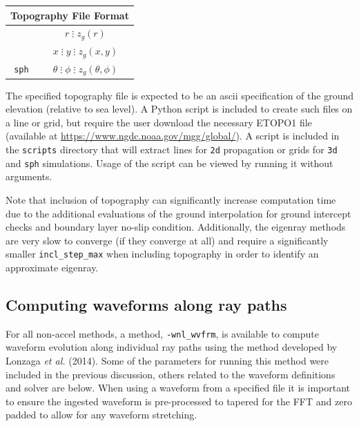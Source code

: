 \documentclass[10pt]{article}
\begin{document}
\begin{center}
\begin{tabular}{| c | c |}
  \hline
  \multicolumn{2}{|c|}{\textbf{Topography File Format}} \\
  \hline
  \verb#2d#	 	& \(r \; \vdots \; z_g \left( r \right) \) \\ \hline
  \verb#3d#	 	& \(x \; \vdots \; y \; \vdots \; z_g \left( x, y \right) \) \\ \hline
  \verb#sph#	 	& \(\theta \; \vdots \; \phi \; \vdots \; z_g \left( \theta, \phi \right) \) \\ \hline
\end{tabular}
\end{center}

The specified topography file is expected to be an ascii specification of the ground elevation (relative to sea level).  A Python script is included to create such files on a line or grid, but require the user download the necessary ETOPO1 file (available at \url{https://www.ngdc.noaa.gov/mgg/global/}).  A script is included in the \verb=scripts= directory that will extract lines for \verb=2d= propagation or grids for \verb=3d= and \verb=sph= simulations.  Usage of the script can be viewed by running it without arguments.

Note that inclusion of topography can significantly increase computation time due to the additional evaluations of the ground interpolation for ground intercept checks and boundary layer no-slip condition.   Additionally, the eigenray methods are very slow to converge (if they converge at all) and require a significantly smaller \verb=incl_step_max= when including topography in order to identify an approximate eigenray.  

\subsection{Computing waveforms along ray paths}
\label{Sect:AdditionalParams:wvfrms}

For all non-accel methods, a method, \verb=-wnl_wvfrm=, is available to compute waveform evolution along individual ray paths using the method developed by Lonzaga \textit{et al.} (2014). Some of the parameters for running this method were included in the previous discussion, others related to the waveform  definitions and solver are below.  When using a waveform from a specified file it is important to ensure the ingested waveform is pre-processed to tapered for the FFT and zero padded to allow for any waveform stretching.\\
\end{document}
